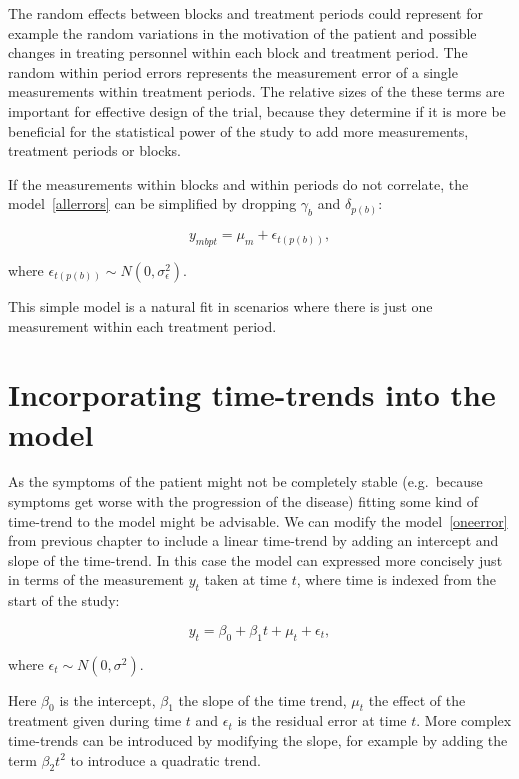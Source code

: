 \documentclass[12pt,a4paper,leqno]{report}
\theoremstyle{plain}
\theoremstyle{definition}
\theoremstyle{remark}
\begin{document}
The random effects between blocks and treatment periods could represent for example the
random variations in the motivation of the patient and possible changes in treating
personnel within each block and treatment period. The random within period errors represents
the measurement error of a single measurements within treatment periods. The relative sizes
of the these terms are important for effective design of the trial, because they determine
if it is more be beneficial for the statistical power of the study to add more measurements,
treatment periods or blocks.

If the measurements within blocks and within periods do not correlate, the model\ \ref{allerrors}
can be simplified by dropping \(\gamma_b\) and \(\delta_{p(b)}\):

\begin{def}\label{}
\begin{equation}\label{oneerror}
y_{mbpt} = \mu_m + \epsilon_{t(p(b))},
\end{equation}
\end{def}where \(\epsilon_{t(p(b))} \sim N(0,\sigma^2_{\epsilon})\).

This simple model is a natural fit in scenarios where there is just one measurement within each
treatment period.

\section{Incorporating time-trends into the model}\label{timetrends}

As the symptoms of the patient might not be completely stable (e.g.\ because symptoms get
worse with the progression of the disease) fitting some kind of time-trend to the model
might be advisable. We can modify the model\ \ref{oneerror} from previous chapter to include a linear
time-trend by adding an intercept and slope of the time-trend. In this case
the model can expressed more concisely just in terms of the measurement \(y_t\) taken at time \(t\),
where time is indexed from the start of the study:

\begin{def}\label{}
\begin{equation}\label{simpletimetrend}
y_t = \beta_0 + \beta_1 t + \mu_t + \epsilon_t,
\end{equation}
\end{def}where \(\epsilon_t \sim N(0,\sigma^2)\).

Here \(\beta_0\) is the intercept, \(\beta_1\) the slope of the time trend, \(\mu_t\) the
effect of the treatment given during time \(t\) and \(\epsilon_t\) is the residual error at time \(t\).
More complex time-trends can be introduced by modifying the slope, for example by adding the term
\(\beta_2 t^2\) to introduce a quadratic trend.
\end{document}
